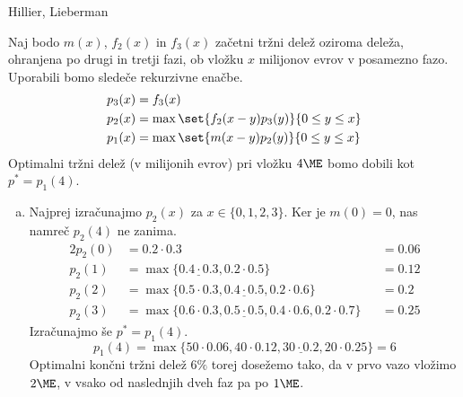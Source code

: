 \begin{naloga}{Hillier, Lieberman}{\cite[Problem~11.3-8]{hl}}
\begin{odgovor}
Naj bodo $m(x)$, $f_2(x)$ in $f_3(x)$ začetni tržni delež oziroma deleža,
ohranjena po drugi in tretji fazi,
ob vložku $x$ milijonov evrov v posamezno fazo.
Uporabili bomo sledeče rekurzivne enačbe.
\begin{align*}
p_3(x) &= f_3(x) \\
p_2(x) &= \max\set{f_2(x-y) p_3(y)}{0 \le y \le x} \\
p_1(x) &= \max\set{m(x-y) p_2(y)}{0 \le y \le x}
\end{align*}
Optimalni tržni delež (v milijonih evrov) pri vložku $4 \ME$
bomo dobili kot $p^* = p_1(4)$.

\begin{enumerate}[(a)]
\item Najprej izračunajmo $p_2(x)$ za $x \in \{0, 1, 2, 3\}$.
Ker je $m(0) = 0$, nas namreč $p_2(4)$ ne zanima.
\begin{alignat*}{2}
p_2(0) &= 0.2 \cdot 0.3 &&= 0.06 \\
p_2(1) &= \max\{\underline{0.4 \cdot 0.3}, 0.2 \cdot 0.5\}  &&= 0.12 \\
p_2(2) &= \max\{0.5 \cdot 0.3, \underline{0.4 \cdot 0.5}, 0.2 \cdot 0.6\}
                                                            &&= 0.2 \\
p_2(3) &= \max\{0.6 \cdot 0.3, \underline{0.5 \cdot 0.5},
                0.4 \cdot 0.6, 0.2 \cdot 0.7\}              &&= 0.25
\end{alignat*}
Izračunajmo še $p^* = p_1(4)$.
$$
p_1(4) = \max\{50 \cdot 0.06, 40 \cdot 0.12, \underline{30 \cdot 0.2},
               20 \cdot 0.25\} = 6
$$
Optimalni končni tržni delež $6 \%$ torej dosežemo tako,
da v prvo vazo vložimo $2 \ME$, v vsako od naslednjih dveh faz pa po $1 \ME$.


\end{enumerate}
\end{odgovor}
\end{naloga}
